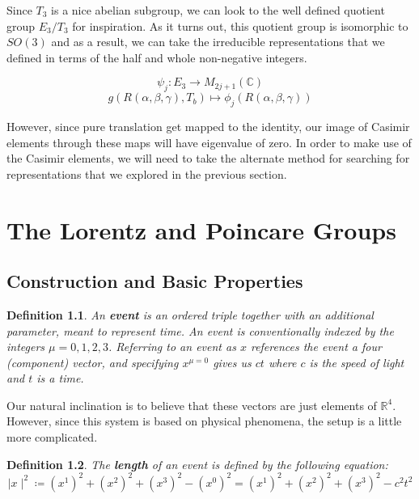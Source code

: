 \documentclass[10pt]{ucthesis}
\newcommand{\R}{\mathbb{R}}
\newcommand{\C}{\mathbb{C}}
\newtheorem{definition}{Definition}[chapter]
\begin{document}
Since $T_3$ is a nice abelian subgroup, we can look to the well defined quotient group $E_3/T_3$ for inspiration. As it turns out, this quotient group is isomorphic to $SO(3)$ and as a result, we can take the irreducible representations that we defined in terms of the half and whole non-negative integers.

$$\psi_j: E_3 \rightarrow M_{2j+1}(\C)$$
$$g(R(\alpha,\beta,\gamma), T_b) \mapsto \phi_j(R(\alpha,\beta,\gamma))$$

However, since pure translation get mapped to the identity, our image of Casimir elements through these maps will have eigenvalue of zero. In order to make use of the Casimir elements, we will need to take the alternate method for searching for representations that we explored in the previous section. 











\newpage

\chapter{The Lorentz and Poincare Groups}

\section{Construction and Basic Properties}

\begin{definition}
	An \textbf{event} is an ordered triple together with an additional parameter, meant to represent time. An event is conventionally indexed by the integers $\mu = 0,1,2,3$. Referring to an event as $x$ references the event a four (component) vector, and specifying $x^{\mu=0}$ gives us $ct$ where $c$ is the speed of light and $t$ is a time. 
\end{definition}

Our natural inclination is to believe that these vectors are just elements of $\R^4$. However, since this system is based on physical phenomena, the setup is a little more complicated.

\begin{definition}
	The \textbf{length} of an event is defined by the following equation:
$$\mid x\mid^2 \coloneq (x^1)^2+(x^2)^2+(x^3)^2 - (x^0)^2 = (x^1)^2+(x^2)^2+(x^3)^2 - c^2t^2$$
\end{definition}
\end{document}
